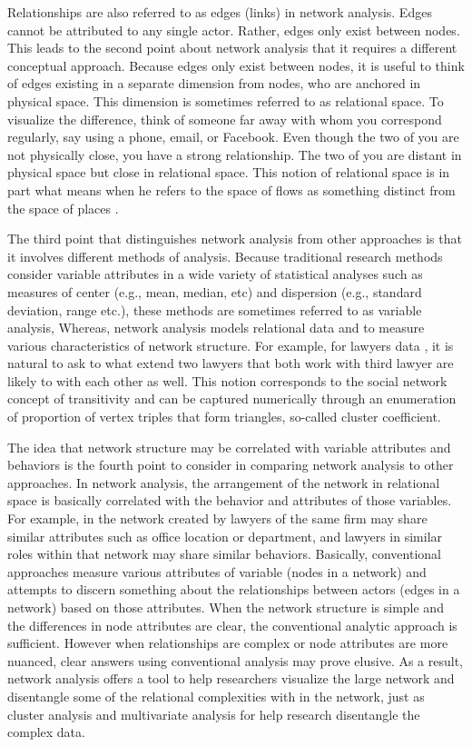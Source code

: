 Relationships are also referred to as edges (links) in network analysis. Edges cannot be attributed to any single actor. Rather, edges only exist between nodes. This leads to the second point about network analysis that it requires a different conceptual approach. Because edges only exist between nodes, it is useful to think of edges existing in a separate dimension from nodes, who are anchored in physical space. This dimension is sometimes referred to as relational space. To visualize the difference, think of someone far away with whom you correspond regularly, say using a phone, email, or Facebook. Even though the two of you are not physically close, you have a strong relationship. The two of you are distant in physical space but close in relational space. This notion of relational space is in part what means when he refers to the space of flows as something distinct from the space of places .

The third point that distinguishes network analysis from other approaches is that it involves different methods of analysis. Because traditional research methods consider variable attributes in a wide variety of statistical analyses such as measures of center (e.g., mean, median, etc) and dispersion (e.g., standard deviation, range etc.), these methods are sometimes referred to as variable analysis, Whereas, network analysis models relational data and to measure various characteristics of network structure. For example, for lawyers data , it is natural to ask to what extend two lawyers that both work with third lawyer are likely to with  each other as well. This notion corresponds to the social network concept of transitivity and can be captured numerically through an enumeration of proportion of vertex triples that form triangles, so-called cluster coefficient. 


The idea that network structure may be correlated with variable attributes and behaviors is the fourth point to consider in comparing network analysis to other approaches. In network analysis, the arrangement of the network in relational space is basically correlated with the behavior and attributes of those variables. For example, in the network created by  lawyers of the same firm may share similar attributes such as office location or department, and lawyers in similar roles within that network may share similar behaviors. Basically, conventional approaches measure various attributes of variable (nodes in a network) and attempts to discern something about the relationships between actors (edges in a network) based on those attributes. When the network structure is simple and the differences in node attributes are clear, the conventional analytic approach is sufficient. However when relationships are complex or node attributes are more nuanced, clear answers using conventional analysis may prove elusive. As a result, network analysis offers a tool to help researchers visualize the large network and disentangle some of the relational complexities with in the network, just as cluster analysis and multivariate analysis for help research disentangle the complex data.



